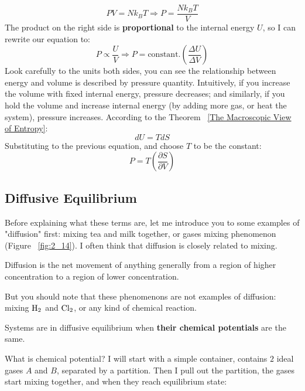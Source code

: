 \documentclass[~/PhyAI/phyai.tex]{subfiles}
\begin{document}
$$ PV=Nk_{B}T \Rightarrow P=\frac{Nk_{B}T }{V}$$
The product on the right side is \textbf{proportional} to the internal energy $U$, so I can rewrite our equation to:
$$ P\propto \frac{U }{V} \Rightarrow P=\text{constant}.\left(\frac{\Delta U }{\Delta V}\right)$$
Look carefully to the units both sides, you can see the relationship between energy and volume is described by pressure quantity. Intuitively, if you increase the volume with fixed internal energy, pressure decreases; and similarly, if you hold the volume and increase internal energy (by adding more gas, or heat the system), pressure increases. According to the Theorem ~\ref{The Macroscopic View of Entropy}:
$$ dU=TdS $$
Substituting to the previous equation, and choose $T$ to be the constant:
$$ P=T\left(\frac{\partial S }{\partial V}\right) $$
\subsection{Diffusive Equilibrium}
Before explaining what these terms are, let me introduce you to some examples of "diffusion" first: mixing tea and milk together, or gases mixing phenomenon (Figure ~\ref{fig:2_14}). I often think that diffusion is closely related to mixing.
\begin{definition}
	\label{Definition of Diffusion}
	Diffusion is the net movement of anything generally from a region of higher concentration to a region of lower concentration.
\end{definition}
But you should note that these phenomenons are not examples of diffusion: mixing $\ce{H2}$ and $\ce{Cl2}$, or any kind of chemical reaction.
\begin{definition}
	\label{Definition of Diffusive Equilibrium}
	Systems are in diffusive equilibrium when \textbf{their chemical potentials} are the same.
\end{definition}
What is chemical potential? I will start with a simple container, contains $2$ ideal gases $A$ and $B$, separated by a partition. Then I pull out the partition, the gases start mixing together, and when they reach equilibrium state:
\end{document}
